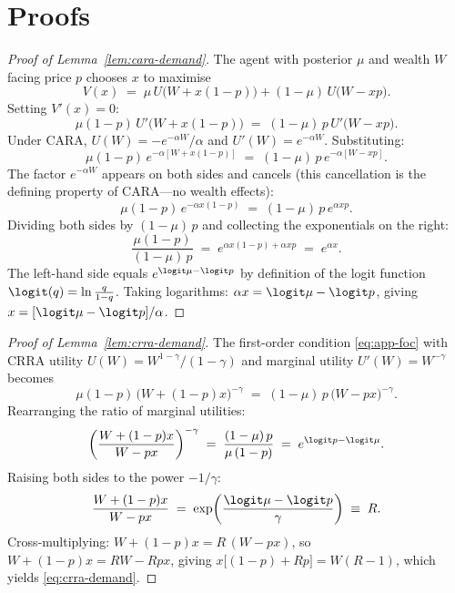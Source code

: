 \section{Proofs}\label{app:proofs}

\begin{proof}[Proof of Lemma~\ref{lem:cara-demand}]
The agent with posterior $\mu$ and wealth $W$ facing price $p$ chooses
$x$ to maximise
\[
   V(x) \;=\; \mu\,U\bigl(W+x(1-p)\bigr) + (1-\mu)\,U\bigl(W-xp\bigr).
\]
Setting $V'(x)=0$:
\begin{equation}
   \mu(1-p)\,U'\bigl(W+x(1-p)\bigr) \;=\; (1-\mu)\,p\,U'\bigl(W-xp\bigr).
\label{eq:app-foc}
\end{equation}
Under CARA, $U(W)=-e^{-\alpha W}/\alpha$ and $U'(W)=e^{-\alpha W}$.
Substituting:
\[
   \mu(1-p)\,e^{-\alpha[W+x(1-p)]} \;=\; (1-\mu)\,p\,e^{-\alpha[W-xp]}.
\]
The factor $e^{-\alpha W}$ appears on both sides and cancels (this
cancellation is the defining property of CARA---no wealth effects):
\[
   \mu(1-p)\,e^{-\alpha x(1-p)} \;=\; (1-\mu)\,p\,e^{\alpha xp}.
\]
Dividing both sides by $(1-\mu)\,p$ and collecting the exponentials on the
right:
\[
   \frac{\mu(1-p)}{(1-\mu)\,p}
   \;=\; e^{\alpha x(1-p)+\alpha xp}
   \;=\; e^{\alpha x}.
\]
The left-hand side equals $e^{\logit\mu-\logit p}$ by definition of the
logit function $\logit(q)=\ln\tfrac{q}{1-q}$. Taking logarithms:
$\alpha x = \logit\mu-\logit p$, giving
$x = [\logit\mu-\logit p]/\alpha$.
\end{proof}

\begin{proof}[Proof of Lemma~\ref{lem:crra-demand}]
The first-order condition \eqref{eq:app-foc} with CRRA utility
$U(W)=W^{1-\gamma}/(1-\gamma)$ and marginal utility $U'(W)=W^{-\gamma}$
becomes
\[
   \mu(1-p)\,\bigl(W+(1-p)x\bigr)^{-\gamma}
   \;=\; (1-\mu)\,p\,\bigl(W-px\bigr)^{-\gamma}.
\]
Rearranging the ratio of marginal utilities:
\[
   \left(\frac{W+(1-p)x}{W-px}\right)^{-\gamma}
   \;=\; \frac{(1-\mu)\,p}{\mu\,(1-p)}
   \;=\; e^{\logit p - \logit\mu}.
\]
Raising both sides to the power $-1/\gamma$:
\[
   \frac{W+(1-p)x}{W-px}
   \;=\; \exp\!\left(\frac{\logit\mu-\logit p}{\gamma}\right) \;\equiv\; R.
\]
Cross-multiplying: $W+(1-p)x = R\,(W-px)$, so
$W + (1-p)x = RW - Rpx$, giving
$x\bigl[(1-p)+Rp\bigr] = W(R-1)$, which yields
\eqref{eq:crra-demand}.
\end{proof}

